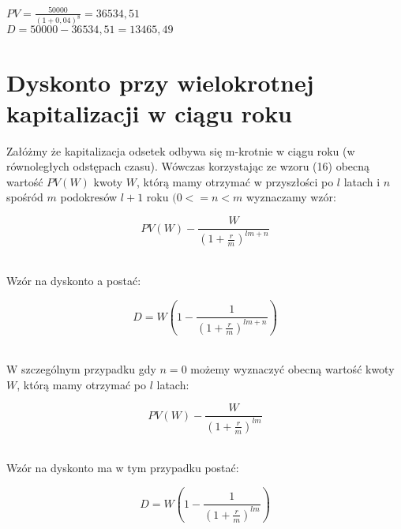 \documentclass{article}
\begin{document}
$ PV = \frac{50 000}{(1 + 0,04)^8}  = 36 534,51$\\

$ D = 50 000 - 36 534,51 = 13 465,49$

\newpage

%
%

\section{Dyskonto przy wielokrotnej kapitalizacji w ciągu roku}

Załóżmy że kapitalizacja odsetek odbywa się m-krotnie w ciągu roku (w równoległych odstępach czasu). Wówczas korzystając ze wzoru (16) obecną wartość $ PV(W) $ kwoty $ W $, którą mamy otrzymać w przyszłości po $ l $ latach i $ n $ spośród $ m $ podokresów $ l + 1  $ roku $ (0 <= n < m $ wyznaczamy wzór:

 
\begin{center}
	\begin{equation}
		PV(W) - \frac{W}{(1 + \frac{r}{m})^{lm + n}}
	\end{equation}
\end{center}\\

Wzór na dyskonto a postać:

\begin{center}
	\begin{equation}
		D = W(1 - \frac{1}{(1 + \frac{r}{m})^{lm + n}})
	\end{equation}
\end{center}\\

W szczególnym przypadku gdy $ n = 0 $ możemy wyznaczyć obecną wartość kwoty $ W $, którą mamy otrzymać po $ l $ latach:

\begin{center}
	\begin{equation}
		PV(W) - \frac{W}{(1 + \frac{r}{m})^{lm}}
	\end{equation}
\end{center}\\

Wzór na dyskonto ma w tym przypadku postać:

\begin{center}
	\begin{equation}
		D = W(1 - \frac{1}{(1 + \frac{r}{m})^{lm}})
	\end{equation}
\end{center}\\
\end{document}
